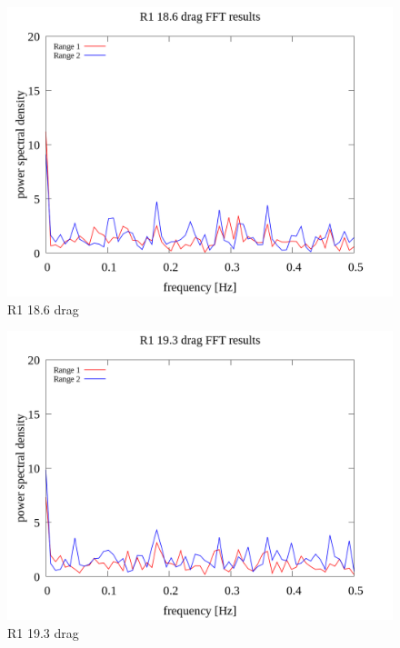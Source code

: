 \documentclass[a4paper]{jsarticle}
\begin{document}
\begin{figure}[htbp]
    \footnotesize
    \begin{center}
        \includegraphics[width=130mm]{../images/R1_18.6_drag_08.png}
        \caption{R1 18.6 drag}
    \end{center}
\end{figure}

\begin{figure}[htbp]
    \footnotesize
    \begin{center}
        \includegraphics[width=130mm]{../images/R1_19.3_drag_08.png} 
        \caption{R1 19.3 drag}
    \end{center}
\end{figure}
\end{document}
